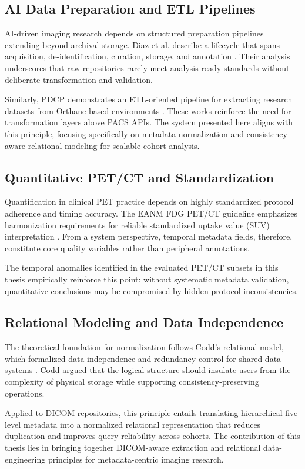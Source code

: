 \subsection{AI Data Preparation and ETL Pipelines}

AI-driven imaging research depends on structured preparation pipelines extending beyond archival storage. Diaz et al. describe a lifecycle that spans acquisition, de-identification, curation, storage, and annotation \cite{DIAZ202125}. Their analysis underscores that raw repositories rarely meet analysis-ready standards without deliberate transformation and validation.

Similarly, PDCP demonstrates an ETL-oriented pipeline for extracting research datasets from Orthanc-based environments \cite{software1020009}. These works reinforce the need for transformation layers above PACS APIs. The system presented here aligns with this principle, focusing specifically on metadata normalization and consistency-aware relational modeling for scalable cohort analysis.

\subsection{Quantitative PET/CT and Standardization}

Quantification in clinical PET practice depends on highly standardized protocol adherence and timing accuracy. The EANM FDG PET/CT guideline emphasizes harmonization requirements for reliable standardized uptake value (SUV) interpretation \cite{suv}. From a system perspective, temporal metadata fields, therefore, constitute core quality variables rather than peripheral annotations.

The temporal anomalies identified in the evaluated PET/CT subsets in this thesis empirically reinforce this point: without systematic metadata validation, quantitative conclusions may be compromised by hidden protocol inconsistencies.

\subsection{Relational Modeling and Data Independence}

The theoretical foundation for normalization follows Codd's relational model, which formalized data independence and redundancy control for shared data systems \cite{codd}. Codd argued that the logical structure should insulate users from the complexity of physical storage while supporting consistency-preserving operations.

Applied to DICOM repositories, this principle entails translating hierarchical five-level metadata into a normalized relational representation that reduces duplication and improves query reliability across cohorts. The contribution of this thesis lies in bringing together DICOM-aware extraction and relational data-engineering principles for metadata-centric imaging research.
